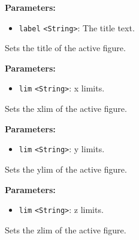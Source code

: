 \documentclass[12pt,a4paper]{article}
\begin{document}
\vspace{5mm}
\noindent {}


\noindent \textbf{Parameters:}
\begin{itemize}
  \item \texttt{label} \texttt{<String>}: The title text.
\end{itemize}

\noindent Sets the title of the active figure.

\vspace{5mm}
\noindent {}


\noindent \textbf{Parameters:}
\begin{itemize}
  \item \texttt{lim} \texttt{<String>}: x limits.
\end{itemize}

\noindent Sets the xlim of the active figure.

\vspace{5mm}
\noindent {}


\noindent \textbf{Parameters:}
\begin{itemize}
  \item \texttt{lim} \texttt{<String>}: y limits.
\end{itemize}

\noindent Sets the ylim of the active figure.

\vspace{5mm}
\noindent {}


\noindent \textbf{Parameters:}
\begin{itemize}
  \item \texttt{lim} \texttt{<String>}: z limits.
\end{itemize}

\noindent Sets the zlim of the active figure.

\vspace{5mm}
\noindent {}
\end{document}
